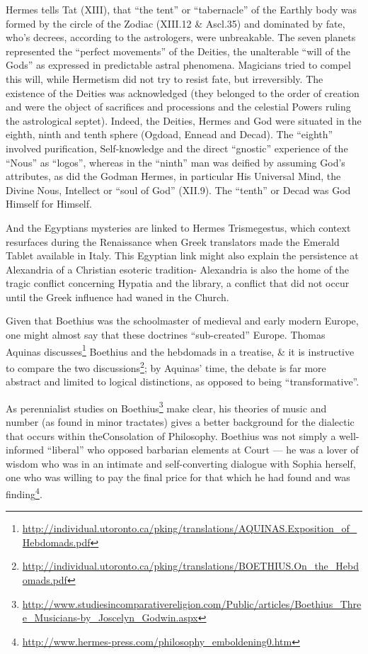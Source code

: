 \begin{quotex}
Hermes tells Tat (XIII), that ``the tent'' or ``tabernacle'' of the Earthly body was formed by the circle of the Zodiac (XIII.12 \& Ascl.35) and dominated by fate, who's decrees, according to the astrologers, were unbreakable. The seven planets represented the ``perfect movements'' of the Deities, the unalterable ``will of the Gods'' as expressed in predictable astral phenomena. Magicians tried to compel this will, while Hermetism did not try to resist fate, but irreversibly. The existence of the Deities was acknowledged (they belonged to the order of creation and were the object of sacrifices and processions and the celestial Powers ruling the astrological septet). Indeed, the Deities, Hermes and God were situated in the eighth, ninth and tenth sphere (Ogdoad, Ennead and Decad). The ``eighth'' involved purification, Self-knowledge and the direct ``gnostic'' experience of the ``Nous'' as ``logos'', whereas in the ``ninth'' man was deified by assuming God's attributes, as did the Godman Hermes, in particular His Universal Mind, the Divine Nous, Intellect or ``soul of God'' (XII.9). The ``tenth'' or Decad was God Himself for Himself.

\end{quotex}


And the Egyptians mysteries are linked to Hermes Trismegestus, which context resurfaces during the Renaissance when Greek translators made the Emerald Tablet available in Italy. This Egyptian link might also explain the persistence at Alexandria of a Christian esoteric tradition- Alexandria is also the home of the tragic conflict concerning Hypatia and the library, a conflict that did not occur until the Greek influence had waned in the Church.

Given that Boethius was the schoolmaster of medieval and early modern Europe, one might almost say that these doctrines ``sub-created'' Europe. Thomas Aquinas discusses\footnote{\url{http://individual.utoronto.ca/pking/translations/AQUINAS.Exposition\_of\_Hebdomads.pdf}} Boethius and the hebdomads in a treatise, \& it is instructive to compare the two discussions\footnote{\url{http://individual.utoronto.ca/pking/translations/BOETHIUS.On\_the\_Hebdomads.pdf}}; by Aquinas' time, the debate is far more abstract and limited to logical distinctions, as opposed to being ``transformative''.

As perennialist studies on Boethius\footnote{\url{http://www.studiesincomparativereligion.com/Public/articles/Boethius\_Three\_Musicians-by\_Joscelyn\_Godwin.aspx}} make clear, his theories of music and number (as found in minor tractates) gives a better background for the dialectic that occurs within theConsolation of Philosophy. Boethius was not simply a well-informed ``liberal'' who opposed barbarian elements at Court --- he was a lover of wisdom who was in an intimate and self-converting dialogue with Sophia herself, one who was willing to pay the final price for that which he had found and was finding\footnote{\url{http://www.hermes-press.com/philosophy\_emboldening0.htm}}.

